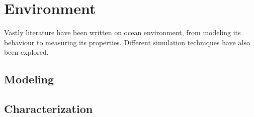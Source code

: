 \section{Environment}

Vastly literature have been written on ocean environment, from modeling its
behaviour to measuring its properties. Different simulation techniques have also
been explored\cite{Etter2013}.

\subsection{Modeling}
\subsection{Characterization}